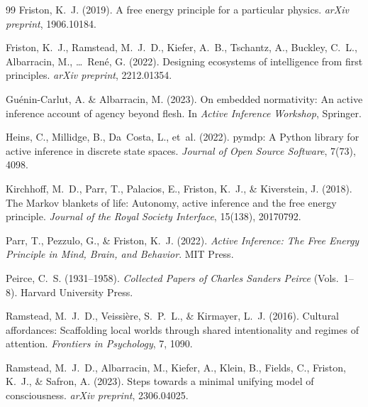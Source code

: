 \documentclass[11pt,a4paper]{article}
\theoremstyle{definition}
\begin{document}
\begin{thebibliography}{99}
Friston, K.~J. (2019).
\newblock A free energy principle for a particular physics.
\newblock \emph{arXiv preprint}, 1906.10184.

Friston, K.~J., Ramstead, M.~J.~D., Kiefer, A.~B., Tschantz, A., Buckley, C.~L., Albarracin, M., \ldots~Ren\'{e}, G. (2022).
\newblock Designing ecosystems of intelligence from first principles.
\newblock \emph{arXiv preprint}, 2212.01354.

Gu\'{e}nin-Carlut, A. \& Albarracin, M. (2023).
\newblock On embedded normativity: An active inference account of agency beyond flesh.
\newblock In \emph{Active Inference Workshop}, Springer.

Heins, C., Millidge, B., Da~Costa, L., et~al. (2022).
\newblock pymdp: A {P}ython library for active inference in discrete state spaces.
\newblock \emph{Journal of Open Source Software}, 7(73), 4098.

Kirchhoff, M.~D., Parr, T., Palacios, E., Friston, K.~J., \& Kiverstein, J. (2018).
\newblock The {M}arkov blankets of life: Autonomy, active inference and the free energy principle.
\newblock \emph{Journal of the Royal Society Interface}, 15(138), 20170792.

Parr, T., Pezzulo, G., \& Friston, K.~J. (2022).
\newblock \emph{Active Inference: The Free Energy Principle in Mind, Brain, and Behavior}.
\newblock MIT Press.

Peirce, C.~S. (1931--1958).
\newblock \emph{Collected Papers of Charles Sanders Peirce} (Vols.~1--8).
\newblock Harvard University Press.

Ramstead, M.~J.~D., Veissi\`{e}re, S.~P.~L., \& Kirmayer, L.~J. (2016).
\newblock Cultural affordances: Scaffolding local worlds through shared intentionality and regimes of attention.
\newblock \emph{Frontiers in Psychology}, 7, 1090.

Ramstead, M.~J.~D., Albarracin, M., Kiefer, A., Klein, B., Fields, C., Friston, K.~J., \& Safron, A. (2023).
\newblock Steps towards a minimal unifying model of consciousness.
\newblock \emph{arXiv preprint}, 2306.04025.


\end{thebibliography}
\end{document}
